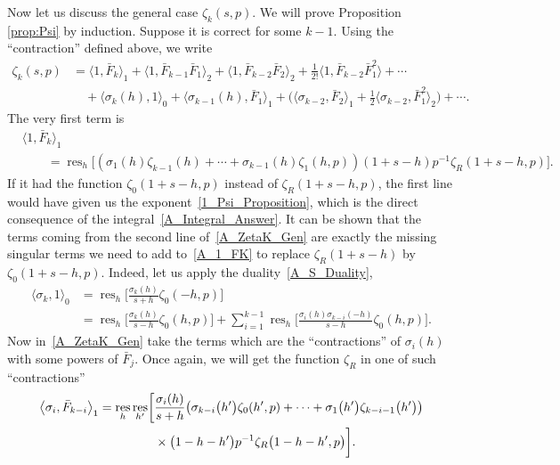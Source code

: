\documentclass[10pt,a4paper]{amsart}
\numberwithin{equation}{section}
\DeclareMathOperator{\res}{res}
\begin{document}
Now let us discuss the general case $\zeta_k(s, p)$. We will prove Proposition \ref{prop:Psi} by induction. Suppose it is correct for some $k-1$. Using the ``contraction'' defined above, we write
\begin{align}
\zeta_k(s, p)&= \bigl\langle 1, \bar{F}_{k} \bigr\rangle_1 + \bigl\langle 1, \bar{F}_{k-1} \bar{F}_1 \bigr\rangle_2 + \bigl\langle 1, \bar{F}_{k-2} \bar{F}_{2} \bigr\rangle_2 + \frac{1}{2!} \bigl\langle 1, \bar{F}_{k-2}\bar{F}_1^2\bigr\rangle + \cdots \nonumber\\
             &\quad{}+ \langle \sigma_k(h), 1 \rangle_0
              + \bigl\langle \sigma_{k-1}(h), \bar{F}_1 \bigr\rangle_1
              + \biggl( \bigl\langle \sigma_{k-2}, \bar{F}_2\bigr\rangle_1 + \frac{1}{2}\bigl\langle \sigma_{k-2}, \bar{F}_1^2 \bigr\rangle_2 \biggr)+ \cdots .\label{A_ZetaK_Gen}
\end{align}
The very first term is
\begin{align}
&\bigl\langle 1, \bar{F}_{k} \bigr\rangle_1 \nonumber\\
&\qquad{}= \res_h \bigl[ (\sigma_1(h)\zeta_{k-1}(h)+\cdots+\sigma_{k-1}(h)\zeta_1(h, p))(1+s-h) p^{-1} \zeta_R(1+s-h, p) \bigr].\label{A_1_FK}
\end{align}
If it had the function $\zeta_0(1+s-h, p)$ instead of $\zeta_R(1+s-h, p)$, the first line would have given us the exponent~\eqref{1_Psi_Proposition}, which is the direct consequence of the integral~\eqref{A_Integral_Answer}. It can be shown that the terms coming from the second line of~\eqref{A_ZetaK_Gen} are exactly the missing singular terms we need to add to~\eqref{A_1_FK} to replace $\zeta_R(1+s-h)$ by $\zeta_0(1+s-h, p)$. Indeed, let us apply the duality~\eqref{A_S_Duality},
\begin{align}
\langle \sigma_k, 1 \rangle_0 &{}= \res_h \biggl[ \frac{\sigma_k(h)}{s+h} \zeta_0(-h, p)\biggr] \nonumber\\
                                 &{}= \res_h \biggl[ \frac{\sigma_k(h)}{s-h} \zeta_0(h, p)\biggr] + \sum_{i=1}^{k-1} \res_h \biggl[ \frac{\sigma_i(h) \sigma_{k-i}(-h)}{s-h} \zeta_0(h, p)\biggr].\label{A_S_Duality_Gen}
\end{align}
Now in~\eqref{A_ZetaK_Gen} take the terms which are the ``contractions'' of $\sigma_i(h)$ with some powers of $\bar{F}_j$. Once again, we will get the function $\zeta_R$ in one of such ``contractions''
\begin{align*}
\begin{split}
&\bigl\langle \sigma_i, \bar{F}_{k-i} \bigr\rangle_1=\res_h\res_{h'} \biggl[ \frac{\sigma_i(h)}{s+h}\bigl(\sigma_{k-i}\bigl(h'\bigr)\zeta_0(h', p) + \cdots+ \sigma_1\bigl(h'\bigr)\zeta_{k-i-1}\bigl(h'\bigr)\bigr)\\
&\hphantom{\bigl\langle \sigma_i, \bar{F}_{k-i} \bigr\rangle_1=\res_h\res_{h'} \biggl[}{}
\times\bigl(1-h-h'\bigr)p^{-1} \zeta_R\bigl(1-h-h', p\bigr) \biggr].
\end{split}
\end{align*}
\end{document}
